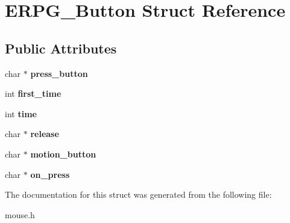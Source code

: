 \hypertarget{structERPG__Button}{\section{E\-R\-P\-G\-\_\-\-Button Struct Reference}
\label{structERPG__Button}
}
\subsection*{Public Attributes}
\begin{DoxyCompactItemize}
\item 
\hypertarget{structERPG__Button_aaa6617ff9a5ed0f8774004589e34d052}{char $\ast$ {\bfseries press\-\_\-button}}\label{structERPG__Button_aaa6617ff9a5ed0f8774004589e34d052}

\item 
\hypertarget{structERPG__Button_aa0c2eb2001f0164389d8cd5a0d964e4b}{int {\bfseries first\-\_\-time}}\label{structERPG__Button_aa0c2eb2001f0164389d8cd5a0d964e4b}

\item 
\hypertarget{structERPG__Button_a241ba89386d73821b8bac33b96d40c18}{int {\bfseries time}}\label{structERPG__Button_a241ba89386d73821b8bac33b96d40c18}

\item 
\hypertarget{structERPG__Button_ac3916ade216581bd22e3766ec74d115d}{char $\ast$ {\bfseries release}}\label{structERPG__Button_ac3916ade216581bd22e3766ec74d115d}

\item 
\hypertarget{structERPG__Button_adba07c20b1f3907c7e7a0c82934e55a2}{char $\ast$ {\bfseries motion\-\_\-button}}\label{structERPG__Button_adba07c20b1f3907c7e7a0c82934e55a2}

\item 
\hypertarget{structERPG__Button_a0ede5a75379b260bba291e774a394dff}{char $\ast$ {\bfseries on\-\_\-press}}\label{structERPG__Button_a0ede5a75379b260bba291e774a394dff}

\end{DoxyCompactItemize}


The documentation for this struct was generated from the following file\-:\begin{DoxyCompactItemize}
\item 
mouse.\-h\end{DoxyCompactItemize}
